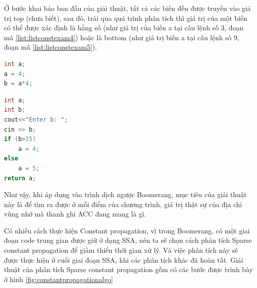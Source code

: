 Ở bước khai báo ban đầu của giải thuật, tất cả các biến đều được truyền vào giá trị top (chưa biết), sau đó, trải qua quá trình phân tích thì giá trị của một biến có thể được xác định là hằng số (như giá trị của biến a tại câu lệnh số 3, đoạn mã \ref{list:listconstexam4}) hoặc là bottom (như giá trị biến a tại câu lệnh số 9, đoạn mã \ref{list:listconstexam5}).
\begin{lstlisting}[caption={Đoạn mã ví dụ biến có giá trị là hằng số},label={list:listconstexam4}, language=c++]
int a;
a = 4;
b = a*4;
\end{lstlisting}
\begin{lstlisting}[caption={Đoạn mã ví dụ biến có giá trị là bottom},label={list:listconstexam5}, language=c++]
int a;
int b;
cout<<"Enter b: ";
cin >> b;
if (b>15)
	a = 4;
else
	a = 5;
return a;
\end{lstlisting}

Như vậy, khi áp dụng vào trình dịch ngược Boomerang, mục tiêu của giải thuật này là để tìm ra được ở mỗi điểm của chương trình, giá trị thật sự của địa chỉ vùng nhớ mà thanh ghi ACC đang mang là gì.

Có nhiều cách thực hiện Constant propagation, vì trong Boomerang, có một giai đoạn code trung gian được giữ ở dạng SSA, nên ta sẽ chọn cách phân tích Sparse constant propagation để giảm thiểu thời gian xử lý. Và việc phân tích này sẽ được thực hiện ở cuối giai đoạn SSA, khi các phân tích khác đã hoàn tất. Giải thuật của phân tích Sparse constant propagation gồm có các bước được trình bày ở hình \ref{fig:constantpropagationalgo}

